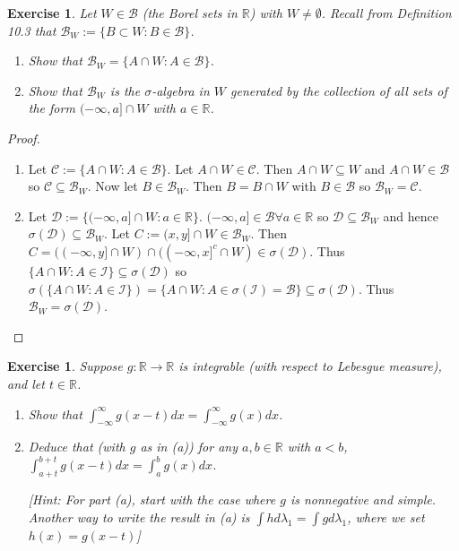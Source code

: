 \documentclass{article}
\newtheorem{exercise}[theorem]{Exercise}
\begin{document}
\begin{exercise}
Let \( W \in \mathcal{B} \) (the Borel sets in \( \mathbb{R} \)) with \( W \neq \emptyset \). Recall from Definition 10.3 that \( \mathcal{B}_W := \{ B \subset W : B \in \mathcal{B} \} \).
\begin{enumerate}
\item[(a)] Show that \( \mathcal{B}_W = \{ A \cap W : A \in \mathcal{B} \} \).
    
\item[(b)] Show that \( \mathcal{B}_W \) is the \(\sigma\)-algebra in \( W \) generated by the collection of all sets of the form \( (-\infty, a] \cap W \) with \( a \in \mathbb{R} \).
\end{enumerate}
\end{exercise}
\begin{proof}
\begin{enumerate}
    \item[(a)] Let $\mathcal{C}:=\{A\cap W:A\in\mathcal{B}\}$. Let $A\cap W\in\mathcal{C}$. Then $A\cap W\subseteq W$ and $A\cap W\in\mathcal{B}$ so $\mathcal{C}\subseteq\mathcal{B}_W$. Now let $B\in\mathcal{B}_W$. Then $B=B\cap W$ with $B\in\mathcal{B}$ so $\mathcal{B}_W=\mathcal{C}$.
    \item[(b)] Let $\mathcal{D}:=\{(-\infty,a]\cap W:a\in\mathbb{R}\}$. $(-\infty,a]\in\mathcal{B}\forall a\in\mathbb{R}$ so $\mathcal{D}\subseteq\mathcal{B}_W$ and hence $\sigma(\mathcal{D})\subseteq\mathcal{B}_W$. Let $C:=(x,y]\cap W\in\mathcal{B}_W$. Then $C=((-\infty,y]\cap W)\cap((-\infty,x]^c\cap W)\in\sigma(\mathcal{D})$. Thus $\{A\cap W:A\in\mathcal{I}\}\subseteq\sigma(\mathcal{D})$ so $\sigma(\{A\cap W:A\in\mathcal{I}\})=\{A\cap W:A\in\sigma(\mathcal{I})=\mathcal{B}\}\subseteq\sigma(\mathcal{D})$. Thus $\mathcal{B}_W=\sigma(\mathcal{D})$.
\end{enumerate}
\end{proof}
\begin{exercise}
Suppose \( g : \mathbb{R} \to \mathbb{R} \) is integrable (with respect to Lebesgue measure), and let \( t \in \mathbb{R} \).
\begin{enumerate}
\item[(a)] Show that \( \int_{-\infty}^{\infty} g(x - t)dx = \int_{-\infty}^{\infty} g(x)dx \).
    
\item[(b)] Deduce that (with \( g \) as in (a)) for any \( a, b \in \mathbb{R} \) with \( a < b \), \( \int_{a+t}^{b+t} g(x - t)dx = \int_{a}^{b} g(x)dx \).
    
    [\textit{Hint: For part (a), start with the case where \( g \) is nonnegative and simple. Another way to write the result in (a) is \( \int h d\lambda_1 = \int g d\lambda_1 \), where we set \( h(x) = g(x - t) \)}]
\end{enumerate}
\end{exercise}    
\end{document}
